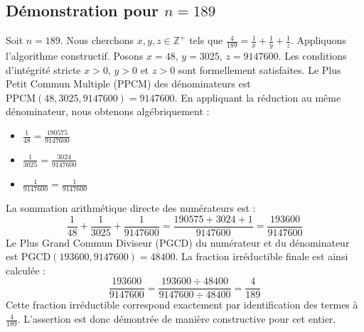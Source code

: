 \documentclass[11pt,a4paper]{article}
\begin{document}
\subsection{Démonstration pour $n = 189$}
Soit $n = 189$. Nous cherchons $x, y, z \in \mathbb{Z}^{+}$ tels que $\frac{4}{189} = \frac{1}{x} + \frac{1}{y} + \frac{1}{z}$.
Appliquons l'algorithme constructif. Posons $x = 48$, $y = 3025$, $z = 9147600$.
Les conditions d'intégrité stricte $x > 0$, $y > 0$ et $z > 0$ sont formellement satisfaites.
Le Plus Petit Commun Multiple (PPCM) des dénominateurs est $\text{PPCM}(48, 3025, 9147600) = 9147600$.
En appliquant la réduction au même dénominateur, nous obtenons algébriquement :
\begin{itemize}
    \item $\frac{1}{48} = \frac{190575}{9147600}$
    \item $\frac{1}{3025} = \frac{3024}{9147600}$
    \item $\frac{1}{9147600} = \frac{1}{9147600}$
\end{itemize}
La sommation arithmétique directe des numérateurs est :
$$ \frac{1}{48} + \frac{1}{3025} + \frac{1}{9147600} = \frac{190575 + 3024 + 1}{9147600} = \frac{193600}{9147600} $$
Le Plus Grand Commun Diviseur (PGCD) du numérateur et du dénominateur est $\text{PGCD}(193600, 9147600) = 48400$.
La fraction irréductible finale est ainsi calculée :
$$ \frac{193600}{9147600} = \frac{193600 \div 48400}{9147600 \div 48400} = \frac{4}{189} $$
Cette fraction irréductible correspond exactement par identification des termes à $\frac{4}{189}$. L'assertion est donc démontrée de manière constructive pour cet entier.
\end{document}
